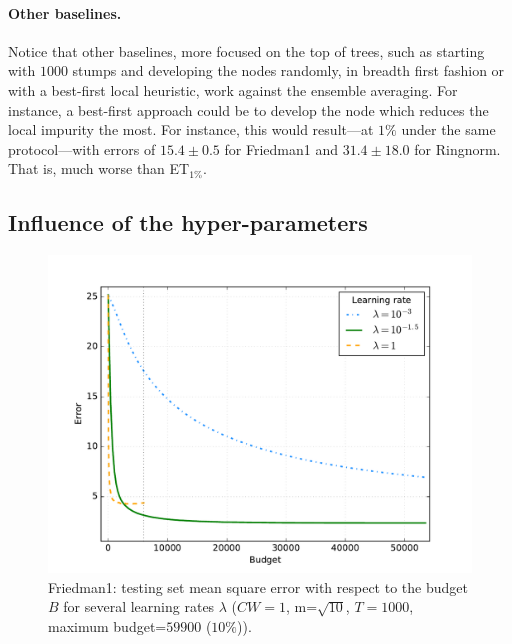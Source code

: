 \documentclass{article}
\begin{document}
\paragraph{Other baselines.}
Notice that other baselines, more focused on the top of trees, such as starting 
with $1000$ stumps and developing the nodes randomly, in breadth first fashion 
or with a best-first local heuristic, work against the ensemble averaging. For 
instance, a best-first approach could be to develop the node which reduces the 
local impurity the most. For instance, this would result---at $1\%$ under the 
same protocol---with errors of $15.4 \pm 0.5$ for Friedman1 and $31.4 \pm 18.0$ 
for Ringnorm. That is, much worse than ET$_{1\%}$.

\subsection{Influence of the hyper-parameters}
\label{subsec:hyperparams}



\begin{figure}[ht]
\begin{center}
\centerline{\includegraphics[width=\columnwidth]{friedman1_lr_cw1}}
\caption{Friedman1: testing set mean square error with respect to the budget $B$
for several learning rates $\lambda$ ($CW=1$, m=$\sqrt{10}$, $T=1000$, maximum 
budget=$59900$ ($10\%$)).}
\label{fig:learningRate}
\end{center}
\vskip -0.2in
\end{figure} 
\end{document}
